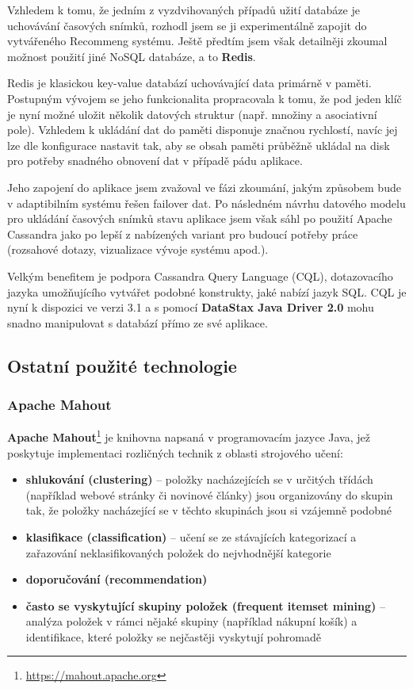 \documentclass[thesis=M,czech]{FITthesis}[2014/05/07]
\begin{document}
Vzhledem k tomu, že jedním z vyzdvihovaných případů užití databáze je uchovávání časových snímků, rozhodl jsem se ji experimentálně zapojit do vytvářeného Recommeng systému. Ještě předtím jsem však detailněji zkoumal možnost použití jiné NoSQL databáze, a to \textbf{Redis}. 

Redis je klasickou key-value databází uchovávající data primárně v paměti. Postupným vývojem se jeho funkcionalita propracovala k tomu, že pod jeden klíč je nyní možné uložit několik datových struktur (např. množiny a asociativní pole). Vzhledem k ukládání dat do paměti disponuje značnou rychlostí, navíc jej lze dle konfigurace nastavit tak, aby se obsah paměti průběžně ukládal na disk pro potřeby snadného obnovení dat v případě pádu aplikace.

Jeho zapojení do aplikace jsem zvažoval ve fázi zkoumání, jakým způsobem bude v adaptibilním systému řešen failover dat. Po následném návrhu datového modelu pro ukládání časových snímků stavu aplikace jsem však sáhl po použití Apache Cassandra jako po lepší z nabízených variant pro budoucí potřeby práce (rozsahové dotazy, vizualizace vývoje systému apod.). 

Velkým benefitem je podpora Cassandra Query Language (CQL), dotazovacího jazyka umožňujícího vytvářet podobné konstrukty, jaké nabízí jazyk SQL. CQL je nyní k dispozici ve verzi 3.1 a s pomocí \textbf{DataStax Java Driver 2.0} mohu snadno manipulovat s databází přímo ze své aplikace. 

\subsection{Ostatní použité technologie}

\subsubsection{Apache Mahout}
\label{mahout}
\textbf{Apache Mahout}\footnote{\url{https://mahout.apache.org}} je knihovna napsaná v programovacím jazyce Java, jež poskytuje implementaci rozličných technik z oblasti strojového učení:

\begin{itemize}
	\item \textbf{shlukování (clustering)} – položky nacházejících se v určitých třídách (například webové stránky či novinové články) jsou organizovány do skupin tak, že položky nacházející se v těchto skupinách jsou si vzájemně podobné
	\item \textbf{klasifikace (classification)} – učení se ze stávajících kategorizací a zařazování neklasifikovaných položek do nejvhodnější kategorie
	\item \textbf{doporučování (recommendation)}
	\item \textbf{často se vyskytující skupiny položek (frequent itemset mining)} – analýza položek v rámci nějaké skupiny (například nákupní košík) a identifikace, které položky se nejčastěji vyskytují pohromadě
\end{itemize}
\end{document}
